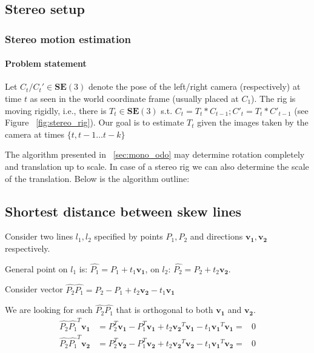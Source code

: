 \documentclass[10pt]{article}         %
\begin{document}
\subsection{Stereo setup}

\subsubsection{Stereo motion estimation}\label{algo}

\paragraph{Problem statement} Let $C_t/C_t' \in \mathbf{SE}(3) $
denote the pose of the left/right camera (respectively) at time $t$ as
seen in the world coordinate frame (usually placed at $C_1$). The rig is
moving rigidly, i.e., there is $T_t \in \mathbf{SE}(3)$ s.t. $ C_t =
T_t*C_{t-1}; C'_t = T_t*C'_{t-1}$ (see Figure ~\ref{fig:stereo_rig}).
Our goal is to estimate $T_t$ given the images taken by the camera at
times $\{t,t-1 \ldots t-k\}$

The algorithm presented in ~\ref{sec:mono_odo} may determine
rotation completely and translation up to scale.  In case of a stereo
rig we can also determine the scale of the translation.  Below is the
algorithm outline:

\subsection{Shortest distance between skew lines}\label{skew}
Consider two lines $l_1,l_2$ specified by points $P_1,P_2$ and directions
$\mathbf{v_1},\mathbf{v_2}$ respectively.

General point on $l_1$ is: $\hat{P_1}=P_1+t_1\mathbf{v_1}$, on $l_2$:
$\hat{P_2}=P_2+t_2\mathbf{v_2}$.

Consider vector $\hat{P_2}\hat{P_1} = P_2-P_1+t_2\mathbf{v_2}-t_1\mathbf{v_1}$

We are looking for such $\hat{P_2}\hat{P_1}$ that is orthogonal to both $\mathbf{v_1}$ and $\mathbf{v_2}$.
\[
\begin{array}{lcl}
   \hat{P_2}\hat{P_1}^T\mathbf{v_1} & =  P_2^T\mathbf{v_1}-P_1^T\mathbf{v_1} + t_2\mathbf{v_2}^T\mathbf{v_1}-t_1\mathbf{v_1}^T\mathbf{v_1} = & 0 \\
   \hat{P_2}\hat{P_1}^T\mathbf{v_2} & = P_2^T\mathbf{v_2}-P_1^T\mathbf{v_2} + t_2\mathbf{v_2}^T\mathbf{v_2}-t_1\mathbf{v_1}^T\mathbf{v_2} = & 0
\end{array}
\]
\end{document}
